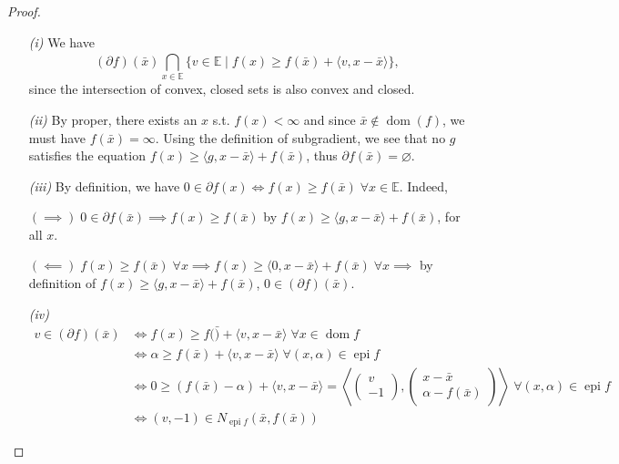 \documentclass{tufte-handout}
\DeclareMathOperator{\epi}{epi}
\DeclareMathOperator{\dom}{dom}
\begin{document}
{{\begin{proposition}
\begin{enumerate}
    \end{enumerate}
    \begin{proof} $  $
      \begin{enumerate}
        \item[\it (i)] We have 
        $$(\partial f)(\bar x) \bigcap^{}_{x \in \mathbb{E}} \{v \in \mathbb{E} \mid f(x) \geq f(\bar x) + \langle v , x - \bar x \rangle \} , $$
        since the intersection of convex, closed sets is also convex and closed.
        \item[\it (ii)] By proper, there exists an $x$ s.t. $f(x) < \infty$ and since $\bar x \notin \dom (f)$, we must have $f(\bar x) = \infty$. Using the definition of subgradient, we see that no $g$ satisfies the equation $f(x) \geq \langle g, x -\bar x\rangle + f(\bar x) $, thus $\partial f(\bar x ) = \varnothing$.
        \item[\it (iii)] By definition, we have $0 \in \partial f(x) \iff f(x) \geq f(\bar x) \; \forall x \in \mathbb{E}.$ Indeed, 

        $(\implies) \; 0 \in \partial f(\bar x) \implies f(x) \geq f(\bar x)$ by $f(x) \geq \langle g, x -\bar x\rangle + f(\bar x) $, for all $x$.

$(\impliedby) \; f(x) \geq f(\bar x) \; \forall x\implies f(x) \geq \langle 0 , x - \bar x \rangle + f(\bar x) \; \forall x \implies $ by definition of $f(x) \geq \langle g, x -\bar x\rangle + f(\bar x) $, $0 \in (\partial f)(\bar x)$. 
        \item[\it (iv)]
        \begin{equation*}
          \begin{split}
            v \in (\partial f) (\bar x) &\iff f(x) \geq f(\bar ) + \langle v, x - \bar x\rangle \; \forall x \in \dom f \\ 
            & \iff \alpha \geq f( \bar x ) + \langle v, x -\bar x\rangle \; \forall (x, \alpha) \in \epi f \\ 
            & \iff 0 \geq (f(\bar x)- \alpha ) + \langle v, x- \bar x\rangle  = \left\langle \begin{pmatrix}
              v \\ -1
            \end{pmatrix}, \begin{pmatrix}
              x- \bar x \\ \alpha - f(\bar x)
            \end{pmatrix}\right\rangle\; \forall (x , \alpha ) \in \epi f \\ 
            &\iff (v, -1) \in N_{\epi f } (\bar x , f(\bar x))
          \end{split}
        \end{equation*}
      \end{enumerate}
    \end{proof}
    

\end{proposition}}}
\end{document}
